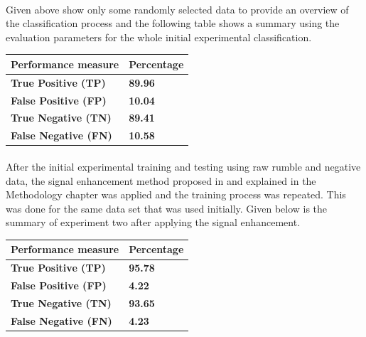 \documentclass[12pt]{article}
\numberwithin{figure}{section}
\numberwithin{table}{section}
\begin{document}
\paragraph{}
Given above show only some randomly selected data to provide an overview of the classification process and the following table shows a summary using the evaluation parameters for the whole initial experimental classification.
\begin{table}[H]
\centering
\begin{tabular}{|m{}|m{}|} 
\hline
\bf {Performance measure} &  {\bf{Percentage}}\\
\hline
\hline
\bf {True Positive (TP)} &  {\bf{89.96}} \\
\hline
\bf {False Positive (FP)} &  {\bf{10.04}} \\
\hline
\bf {True Negative (TN)} &  {\bf{89.41}} \\
\hline
\bf {False Negative (FN)} &  {\bf{10.58}} \\
\hline
\end{tabular}
\end{table}


\paragraph{}
After the initial experimental training and testing using raw rumble and negative data, the signal enhancement method proposed in \cite{11} and explained in the Methodology chapter was applied and the training process was repeated. This was done for the same data set that was used initially. Given below is the summary of experiment two after applying the signal enhancement.
\begin{table}[H]
\centering
\begin{tabular}{|m{}|m{}|} 
\hline
\bf {Performance measure} &  {\bf{Percentage}}\\
\hline
\hline
\bf {True Positive (TP)} &  {\bf{95.78}} \\
\hline
\bf {False Positive (FP)} &  {\bf{4.22}} \\
\hline
\bf {True Negative (TN)} &  {\bf{93.65}} \\
\hline
\bf {False Negative (FN)} &  {\bf{4.23}} \\
\hline
\end{tabular}
\end{table}
\end{document}
